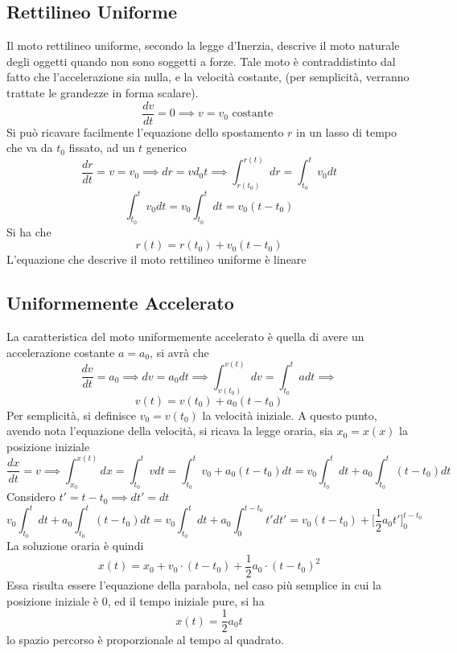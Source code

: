 \documentclass[10pt, letterpaper]{report}
\begin{document}
\subsection{Rettilineo Uniforme} 
Il moto rettilineo uniforme, secondo la legge d'Inerzia, descrive il moto naturale degli 
oggetti quando non sono soggetti a forze. Tale moto è contraddistinto dal fatto che 
l'accelerazione sia nulla, e la velocità costante, (per semplicità, verranno trattate 
le grandezze in forma scalare).
$$\frac{dv}{dt}=0\implies v = v_0 \text{ costante }$$
Si può ricavare facilmente l'equazione dello spostamento $r$ in un 
lasso di tempo che va da $t_0$ fissato, ad un $t$ generico
$$ \frac{dr}{dt}=v=v_0\implies dr=vd_0t\implies\int_{r(t_0)}^{r(t)}dr=\int_{t_0}^tv_0dt $$
$$\int_{t_0}^tv_0dt=v_0\int_{t_0}^tdt=v_0(t-t_0) $$
Si ha che  
$$ r(t)=r(t_0)+v_0(t-t_0)$$
L'equazione che descrive il moto rettilineo uniforme è lineare
\begin{center}
\end{center} 
\subsection{Uniformemente Accelerato}
La caratteristica del moto uniformemente accelerato è quella di avere un accelerazione costante 
$a = a_0 $, si avrà che 
$$ \frac{dv}{dt}=a_0\implies dv =a_0dt\implies \int_{v(t_0)}^{v(t)}dv=\int_{t_0}^tadt\implies$$
$$v(t)=v(t_0)+a_0(t-t_0) $$
Per semplicità, si definisce $v_0=v(t_0)$ la velocità iniziale. A questo punto, avendo nota l'equazione 
della velocità, si ricava la legge oraria, sia $x_0=x(x)$ la posizione iniziale 
$$ \frac{dx}{dt}=v\implies \int_{x_0}^{x(t)}dx=\int_{t_0}^t vdt = \int_{t_0}^tv_0+a_0(t-t_0)dt= 
v_0\int_{t_0}^tdt+a_0\int_{t_0}^t(t-t_0)dt$$
Considero $t'=t-t_0\implies dt'=dt$ 
$$ v_0\int_{t_0}^tdt+a_0\int_{t_0}^t(t-t_0)dt= 
v_0\int_{t_0}^tdt+a_0\int_{0}^{t-t_0}t'dt'=v_0(t-t_0)+\Big[\dfrac{1}{2}a_0t'\Big]_0^{t-t_0}$$
La soluzione oraria è quindi 
$$ x(t)=x_0+v_0\cdot (t-t_0)+\frac{1}{2}a_0\cdot (t-t_0)^2$$
Essa risulta essere l'equazione della parabola, nel caso più semplice in cui la posizione 
iniziale è 0, ed il tempo iniziale pure, si ha  
$$ x(t)=\dfrac{1}{2}a_0t$$
lo spazio percorso è proporzionale al tempo al 
quadrato.
\end{document}
